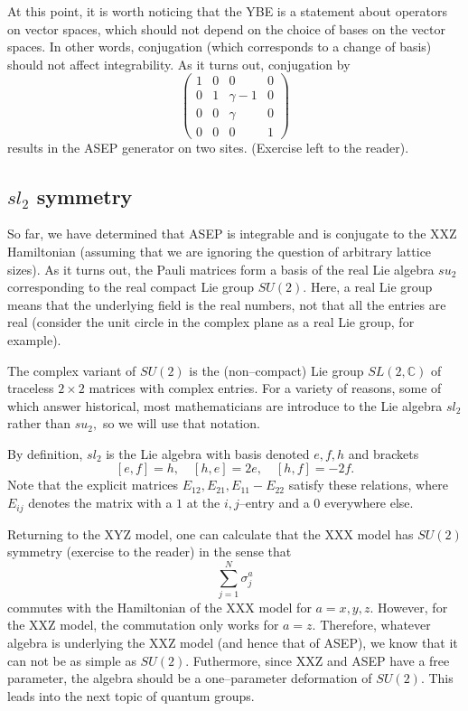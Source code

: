 \documentclass{ximera}
\begin{document}
At this point, it is worth noticing that the YBE is a statement about operators on vector spaces, 
which should not depend on the choice of bases on the vector spaces. In other words, conjugation 
(which corresponds to a change of basis) should not affect integrability. As it turns out, conjugation by 
\[
\left( \begin{array}{cccc}
1 & 0 & 0 & 0 \\
0 & 1 & \gamma-1 & 0 \\
0 & 0 & \gamma & 0 \\
0 & 0 & 0 & 1
\end{array} \right)
\]
results in the ASEP generator on two sites. (Exercise left to the reader).



\subsection{\(sl_2\) symmetry}
So far, we have determined that ASEP is integrable and is conjugate to the XXZ Hamiltonian
(assuming that we are ignoring the question of arbitrary lattice sizes). As it turns out, the
Pauli matrices form a basis of the real Lie algebra \(su_2\) corresponding to the real compact Lie group 
\(SU(2).\) Here, a real Lie group means that the underlying field is the real numbers, not that
all the entries are real (consider the unit circle in the complex plane as a real Lie group, for example).

The complex variant of \(SU(2)\) is the (non--compact) Lie group \(SL(2,\mathbb{C})\) of traceless 
\(2 \times 2\) matrices with complex entries. For a variety of reasons, some of which answer historical,
most mathematicians are introduce to the Lie algebra \(sl_2\) rather than \(su_2,\) so we will use that notation.

By definition, \(sl_2\) is the Lie algebra with basis denoted \(e,f,h\) and brackets
\[
[e,f]=h, \quad [h,e]=2e, \quad [h,f]=-2f.
\]
Note that the explicit matrices \(E_{12},E_{21},E_{11}-E_{22}\) satisfy these relations, where
\(E_{ij}\) denotes the matrix with a \(1\) at the \(i,j\)--entry and a 0 everywhere else. 

Returning to the XYZ model, one can calculate that the XXX model has \(SU(2)\) symmetry (exercise to the
reader) in the sense that
\[
\sum_{j=1}^N \sigma^a_j
\]
commutes with the Hamiltonian of the XXX model for \(a=x,y,z.\) However, for the XXZ model, the
commutation only works for \(a=z.\) Therefore, whatever algebra is underlying the XXZ model (and hence
that of ASEP), we know that it can not be as simple as \(SU(2).\) Futhermore, since XXZ and ASEP have
a free parameter, the algebra should be a one--parameter deformation of \(SU(2).\) This leads into
the next topic of quantum groups. 
\end{document}
